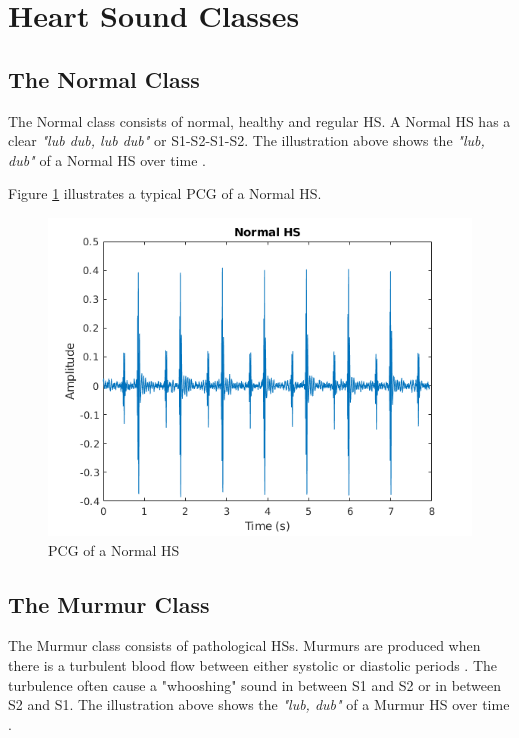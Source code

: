 \documentclass[10pt,twocolumn]{witseiepaper}
\begin{document}

\appendix
\section{Heart Sound Classes}
\label{HS}

\subsection*{The Normal Class}
The Normal class consists of normal, healthy and regular HS. A Normal HS has a clear \textit{"lub dub, lub dub"} or S1-S2-S1-S2. The illustration above shows the \textit{"lub, dub"} of a Normal HS over time \cite{bentley}.


Figure \ref{fig:normal} illustrates a typical PCG of a Normal HS.
\begin{figure}[h!]
    \centering
    \includegraphics[scale = 0.45]{./normal.png}
    \caption{PCG of a Normal HS}
    \label{fig:normal}
\end{figure}{}

\subsection*{The Murmur Class}
The Murmur class consists of pathological HSs. Murmurs are produced when there is a turbulent blood flow between either systolic or diastolic periods \cite{35}. The turbulence often cause a "whooshing" sound in between S1 and S2 or in between S2 and S1. The illustration above shows the \textit{"lub, dub"} of a Murmur HS over time \cite{bentley}.
\end{document}
